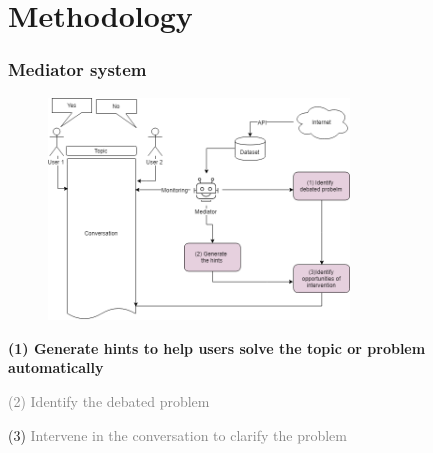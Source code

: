 \documentclass{beamer}
\begin{document}
\section{Methodology} %
\begin{frame}
\frametitle{Mediator system}
\begin{figure}
	\includegraphics[width=80mm]{eee.png}
\end{figure}

\end{frame}
\begin{frame}
\par 	\textbf{(1)  Generate hints to help users solve the topic or problem automatically}
\par \textcolor{gray}{(2) Identify the debated problem }
\par (3) \textcolor{gray}{ Intervene in the conversation to clarify the problem }
\end{frame}
\end{document}
